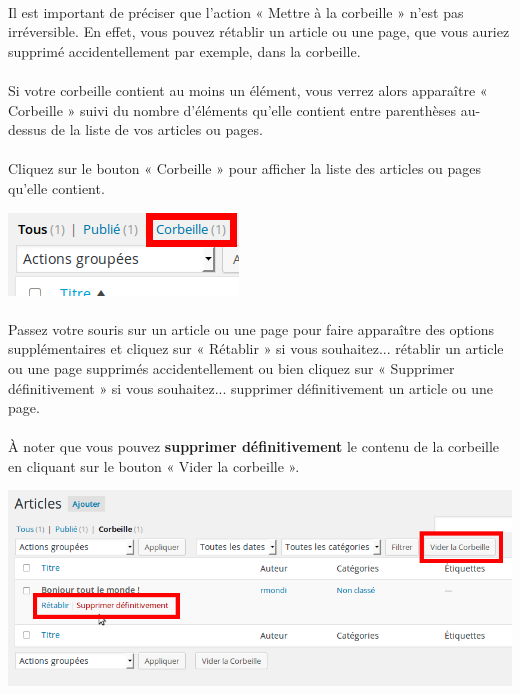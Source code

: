 \documentclass[10pt,a4paper]{article}
\begin{document}
\paragraph{}Il est important de préciser que l'action « Mettre à la corbeille » n'est pas irréversible. En effet, vous pouvez rétablir un article ou une page, que vous auriez supprimé accidentellement par exemple, dans la corbeille.
\paragraph{}Si votre corbeille contient au moins un élément, vous verrez alors apparaître « Corbeille » suivi du nombre d'éléments qu'elle contient entre parenthèses au-dessus de la liste de vos articles ou pages.
\paragraph{}Cliquez sur le bouton « Corbeille » pour afficher la liste des articles ou pages qu'elle contient.
\begin{center}
\includegraphics[scale=0.35]{img/0069.png}
\end{center}
\paragraph{}Passez votre souris sur un article ou une page pour faire apparaître des options supplémentaires et cliquez sur « Rétablir » si vous souhaitez... rétablir un article ou une page supprimés accidentellement ou bien cliquez sur « Supprimer définitivement » si vous souhaitez... supprimer définitivement un article ou une page.
\paragraph{}À noter que vous pouvez \textbf{supprimer définitivement} le contenu de la corbeille en cliquant sur le bouton « Vider la corbeille ».
\begin{center}
\includegraphics[scale=0.35]{img/0070.png}
\end{center}
\end{document}
